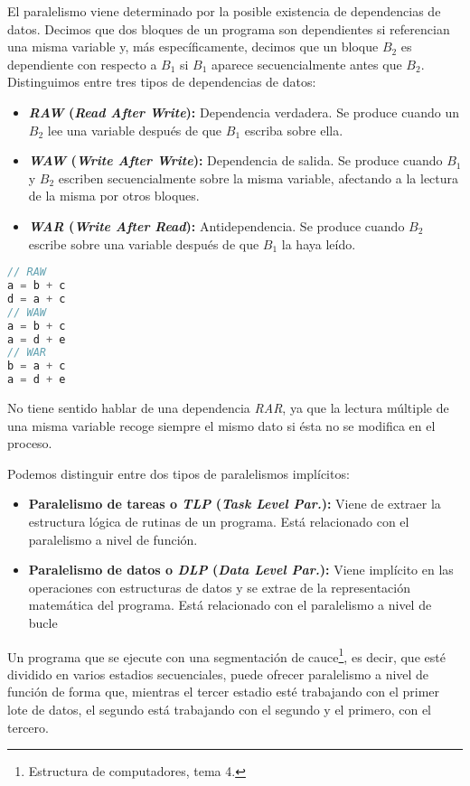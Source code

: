 El paralelismo viene determinado por la posible existencia de dependencias de datos.
Decimos que dos bloques de un programa son dependientes si referencian una misma variable y, más específicamente, decimos que un bloque $B_2$ es dependiente con respecto a $B_1$ si $B_1$ aparece secuencialmente antes que $B_2$.
Distinguimos entre tres tipos de dependencias de datos:

\begin{itemize}
	\item\textbf{\textit{RAW} (\textit{Read After Write}):} Dependencia verdadera. Se produce cuando un $B_2$ lee una variable después de que $B_1$ escriba sobre ella.
	\item\textbf{\textit{WAW} (\textit{Write After Write}):} Dependencia de salida. Se produce cuando $B_1$ y $B_2$ escriben secuencialmente sobre la misma variable, afectando a la lectura de la misma por otros bloques.
	\item\textbf{\textit{WAR} (\textit{Write After Read}):} Antidependencia. Se produce cuando $B_2$ escribe sobre una variable después de que $B_1$ la haya leído.
\end{itemize}

\pagebreak

\begin{lstlisting}[language=C]
// RAW
a = b + c
d = a + c
// WAW
a = b + c
a = d + e
// WAR
b = a + c
a = d + e
\end{lstlisting}

No tiene sentido hablar de una dependencia \textit{RAR}, ya que la lectura múltiple de una misma variable recoge siempre el mismo dato si ésta no se modifica en el proceso.

Podemos distinguir entre dos tipos de paralelismos implícitos:

\begin{itemize}
	\item\textbf{Paralelismo de tareas o \textit{TLP} (\textit{Task Level Par.}):} Viene de extraer la estructura lógica de rutinas de un programa. Está relacionado con el paralelismo a nivel de función.
	\item\textbf{Paralelismo de datos o \textit{DLP} (\textit{Data Level Par.}):} Viene implícito en las operaciones con estructuras de datos y se extrae de la representación matemática del programa. Está relacionado con el paralelismo a nivel de bucle
\end{itemize}

Un programa que se ejecute con una segmentación de cauce\footnote{Estructura de computadores, tema 4.}, es decir, que esté dividido en varios estadios secuenciales, puede ofrecer paralelismo a nivel de función de forma que, mientras el tercer estadio esté trabajando con el primer lote de datos, el segundo está trabajando con el segundo y el primero, con el tercero.

